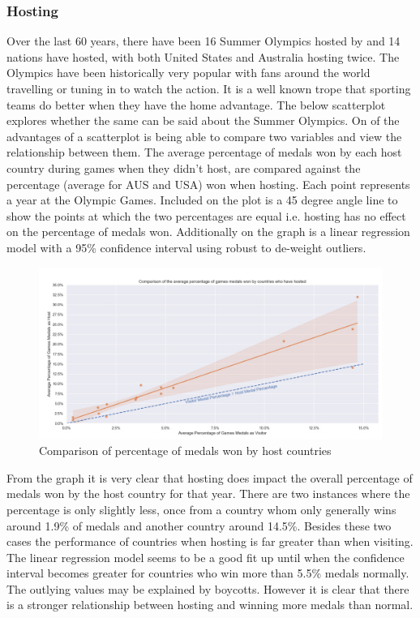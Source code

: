 \documentclass[a4 paper, 12pt]{article}
\begin{document}
        \subsubsection{Hosting}
        Over the last 60 years, there have been 16 Summer Olympics hosted by and 14 nations have hosted, with both United States and Australia hosting twice. The Olympics have been historically very popular with fans around the world travelling or tuning in to watch the action. It is a well known trope that sporting teams do better when they have the home advantage. The below scatterplot explores whether the same can be said about the Summer Olympics. On of the advantages of a scatterplot is being able to compare two variables and view the relationship between them. The average percentage of medals won by each host country during games when they didn't host, are compared against the percentage (average for AUS and USA) won when hosting. Each point represents a year at the Olympic Games. Included on the plot is a 45 degree angle line to show the points at which the two percentages are equal i.e. hosting has no effect on the percentage of medals won. Additionally on the graph is a linear regression model with a 95\% confidence interval using robust to de-weight outliers. 

        \begin{figure} [H]
            \centering
            \includegraphics[width=\textwidth, frame]
                {./images/graph/countries_host_lmplot.png}      
                \caption{Comparison of percentage of medals won by host countries} 
        \end{figure}
        From the graph it is very clear that hosting does impact the overall percentage of medals won by the host country for that year. There are two instances where the percentage is only slightly less, once from a country whom only generally wins around 1.9\% of medals and another country around 14.5\%. Besides these two cases the performance of countries when hosting is far greater than when visiting. The linear regression model seems to be a good fit up until when the confidence interval becomes greater for countries who win more than 5.5\% medals normally. The outlying values may be explained by boycotts. However it is clear that there is a stronger relationship between hosting and winning more medals than normal. 
\end{document}
